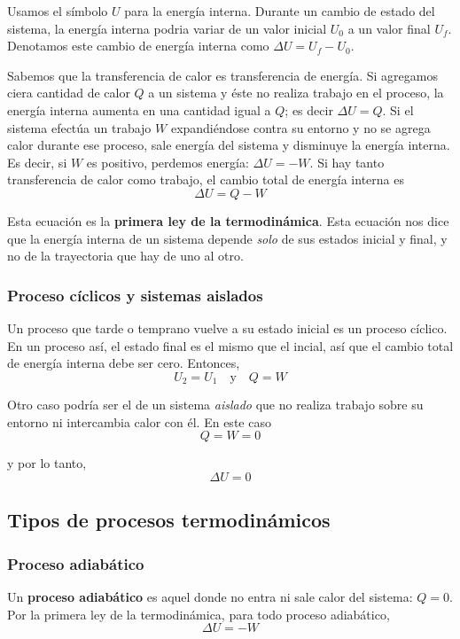 \documentclass[12pt]{article}
\begin{document}
  Usamos el símbolo $ U $ para la energía interna. Durante un cambio de estado del sistema, la energía interna podria variar de un valor inicial $ U_{0} $ a un valor final $ U_{f} $. Denotamos este cambio de energía interna como $ \Delta U = U_{f} - U_{0} $.

  Sabemos que la transferencia de calor es transferencia de energía. Si agregamos ciera cantidad de calor $ Q $ a un sistema y éste no realiza trabajo en el proceso, la energía interna aumenta en una cantidad igual a $ Q $; es decir $ \Delta U = Q $. Si el sistema efectúa un trabajo $ W $ expandiéndose contra su entorno y no se agrega calor durante ese proceso, sale energía del sistema y disminuye la energía interna. Es decir, si $ W $ es positivo, perdemos energía: $ \Delta U = -W $. Si hay tanto transferencia de calor como trabajo, el cambio total de energía interna es
  \[
  \Delta U = Q - W
  \]

  Esta ecuación es la \textbf{primera ley de la termodinámica}. Esta ecuación nos dice que la energía interna de un sistema depende \textit{solo} de sus estados inicial y final, y no de la trayectoria que hay de uno al otro.

  \subsubsection{Proceso cíclicos y sistemas aislados}
  Un proceso que tarde o temprano vuelve a su estado inicial es un proceso cíclico. En un proceso así, el estado final es el mismo que el incial, así que el cambio total de energía interna debe ser cero. Entonces, 
  \[
  U_{2} = U_{1} \quad \text{y} \quad Q = W
  \]

  Otro caso podría ser el de un sistema \textit{aislado} que no realiza trabajo sobre su entorno ni intercambia calor con él. En este caso 
  \[
  Q = W = 0
  \]

  y por lo tanto,
  \[
  \Delta U = 0
  \]

  \subsection{Tipos de procesos termodinámicos}
  \subsubsection{Proceso adiabático}
  Un \textbf{proceso adiabático} es aquel donde no entra ni sale calor del sistema: $ Q = 0 $. Por la primera ley de la termodinámica, para todo proceso adiabático, 
  \[
  \Delta U = -W
  \]
\end{document}
